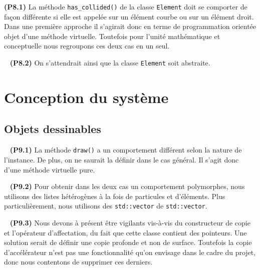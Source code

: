 \documentclass[12pt, letterpaper, twoside]{article}
\newcommand{\T}[1]{\texttt{#1}}
\begin{document}
\noindent \textbf{(P8.1)} La méthode \T{has\_collided()} de la classe \T{Element} doit se comporter de façon différente si elle est appelée sur un élément courbe ou sur un élément droit. Dans une première approche il s'agirait donc en terme de programmation orientée objet d'une méthode virtuelle. Toutefois pour l'unité mathématique et conceptuelle nous regroupons ces deux cas en un seul.

\ \linebreak
\noindent \textbf{(P8.2)} On s'attendrait ainsi que la classe \T{Element} soit abstraite.

\section{Conception du système}

\subsection{Objets dessinables}

\ \linebreak
\noindent \textbf{(P9.1)} La méthode \T{draw()} a un comportement différent selon la nature de l'instance. De plus, on ne saurait la définir dans le cas général. Il s'agit donc d'une méthode virtuelle pure.

\ \linebreak
\noindent \textbf{(P9.2)} Pour obtenir dans les deux cas un comportement polymorphes, nous utilisons des listes hétérogènes à la fois de particules et d'éléments. Plus particulièrement, nous utilisons des \T{std::vector} de \T{std::vector}.

\ \linebreak
\noindent \textbf{(P9.3)} Nous devons à présent être vigilants vis-à-vis du constructeur de copie et l'opérateur d'affectation, du fait que cette classe contient des pointeurs. Une solution serait de définir une copie profonde et non de surface. Toutefois la copie d'accélérateur n'est pas une fonctionnalité qu'on envisage dans le cadre du projet, donc nous contentons de supprimer ces derniers.
\end{document}

